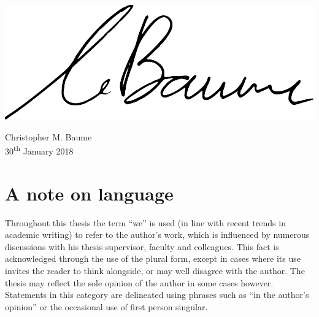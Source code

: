 \documentclass[11pt,a4paper,twoside,openany]{book}
\begin{document}
\vspace{1cm}
\hfill
\includegraphics[width=.3\textwidth]{figs/signature.pdf}
\begin{flushright}
Christopher M. Baume\\
30\textsuperscript{th} January 2018
\end{flushright}



\chapter*{A note on language}
 Throughout this thesis the term ``we'' is used (in line with recent trends in academic writing) to refer to the
 author’s work, which is influenced by numerous discussions with his thesis supervisor, faculty and colleagues. This
 fact is acknowledged through the use of the plural form, except in cases where its use invites the reader to think
 alongside, or may well disagree with the author. The thesis may reflect the sole opinion of the author in some cases
 however. Statements in this category are delineated using phrases such as ``in the author’s opinion'' or the occasional
 use of first person singular.

\tableofcontents



\listoffigures

\listoftables



\pagestyle{fancy}
\mainmatter

\cleardoublepage


\cleardoublepage


\cleardoublepage


\cleardoublepage


\cleardoublepage


\cleardoublepage


\cleardoublepage


\begin{appendices}
  \renewcommand\chaptername{Appendix}
  \cleardoublepage
  
\end{appendices}

\cleardoublepage
\fancyhead[LO]{\leftmark}
\fancyhead[RE]{\rightmark}
\printbibliography
\end{document}
